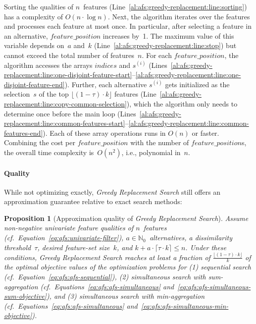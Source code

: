 \documentclass{article}
\newtheorem{proposition}{Proposition}
\theoremstyle{definition}
\begin{document}
Sorting the qualities of $n$~features (Line~\ref{al:afs:greedy-replacement:line:sorting}) has a complexity of $O(n \cdot \log n)$.
Next, the algorithm iterates over the features and processes each feature at most once.
In particular, after selecting a feature in an alternative, $feature\_position$ increases by~1.
The maximum value of this variable depends on~$a$ and~$k$ (Line~\ref{al:afs:greedy-replacement:line:stop}) but cannot exceed the total number of features~$n$.
For each $feature\_position$, the algorithm accesses the arrays $indices$ and $s^{(i)}$ (Lines~\ref{al:afs:greedy-replacement:line:one-disjoint-feature-start}--\ref{al:afs:greedy-replacement:line:one-disjoint-feature-end}).
Further, each alternative $s^{(i)}$ gets initialized as the selection~$s$ of the top $\lfloor (1 - \tau) \cdot k \rfloor$ features (Line~\ref{al:afs:greedy-replacement:line:copy-common-selection}), which the algorithm only needs to determine once before the main loop (Lines~\ref{al:afs:greedy-replacement:line:common-features-start}--\ref{al:afs:greedy-replacement:line:common-features-end}).
Each of these array operations runs in $O(n)$ or faster.
Combining the cost per $feature\_position$ with the number of $feature\_position$s, the overall time complexity is~$O(n^2)$, i.e., polynomial in~$n$.

\paragraph{Quality}

While not optimizing exactly, \emph{Greedy Replacement Search} still offers an approximation guarantee relative to exact search methods:
%
\begin{proposition}[Approximation quality of \emph{Greedy Replacement Search}]
	Assume non-negative univariate feature qualities of $n$~features (cf.~Equation~\ref{eq:afs:univariate-filter}), $a \in \mathbb{N}_0$~alternatives, a dissimilarity threshold~$\tau$, desired feature-set size~$k$, and $k + a \cdot \lceil \tau \cdot k \rceil \leq n$.
	Under these conditions, \emph{Greedy Replacement Search} reaches at least a fraction of $\frac{\lfloor (1 - \tau) \cdot k \rfloor}{k}$ of the optimal objective values of the optimization problems for (1) sequential search (cf.~Equation~\ref{eq:afs:afs-sequential}), (2) simultaneous search with sum-aggregation (cf.~Equations~\ref{eq:afs:afs-simultaneous} and~\ref{eq:afs:afs-simultaneous-sum-objective}), and (3) simultaneous search with min-aggregation (cf.~Equations~\ref{eq:afs:afs-simultaneous} and~\ref{eq:afs:afs-simultaneous-min-objective}).
	\label{prop:afs:approximation-greedy-replacement}
\end{proposition}
\end{document}

